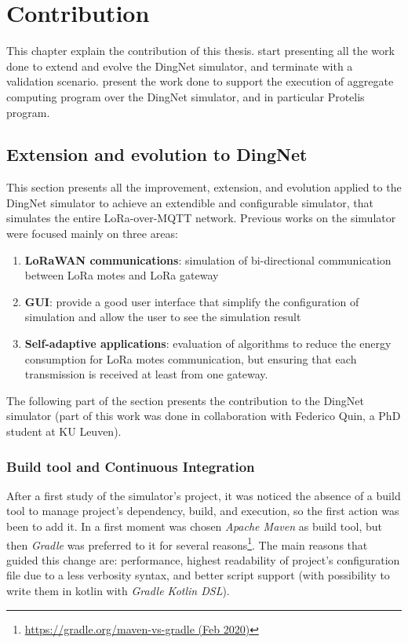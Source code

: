 \chapter{Contribution}
\label{chap:contribution}
This chapter explain the contribution of this thesis.  start presenting all the work done to extend and evolve the DingNet simulator, and terminate with a validation scenario.  present the work done to support the execution of aggregate computing program over the DingNet simulator, and in particular Protelis program. 

\section{Extension and evolution to DingNet}
\label{sec:contributionDingNet}
This section presents all the improvement, extension, and evolution applied to the DingNet simulator to achieve an extendible and configurable simulator, that simulates the entire LoRa-over-MQTT network. 
Previous works on the simulator were focused mainly on three areas:
\begin{enumerate}
    \item \textbf{LoRaWAN communications}: simulation of bi-directional communication between LoRa motes and LoRa gateway
    \item \textbf{GUI}: provide a good user interface that simplify the configuration of simulation and allow the user to see the simulation result
    \item \textbf{Self-adaptive applications}: evaluation of algorithms to reduce the energy consumption for LoRa motes communication, but ensuring that each transmission is received at least from one gateway.
\end{enumerate}
The following part of the section presents the contribution to the DingNet simulator (part of this work was done in collaboration with Federico Quin, a PhD student at KU Leuven).
\clearpage
\subsection{Build tool and Continuous Integration}
After a first study of the simulator's project, it was noticed the absence of a build tool to manage project's dependency, build, and execution, so the first action was been to add it. 
In a first moment was chosen \textit{Apache Maven} as build tool, but then \textit{Gradle} was preferred to it for several reasons\footnote{ \href{https://gradle.org/maven-vs-gradle/}{https://gradle.org/maven-vs-gradle (Feb 2020)}}. The main reasons that guided this change are: performance, highest readability of project's configuration file due to a less verbosity syntax, and better script support (with possibility to write them in kotlin with \textit{Gradle Kotlin DSL}). 

